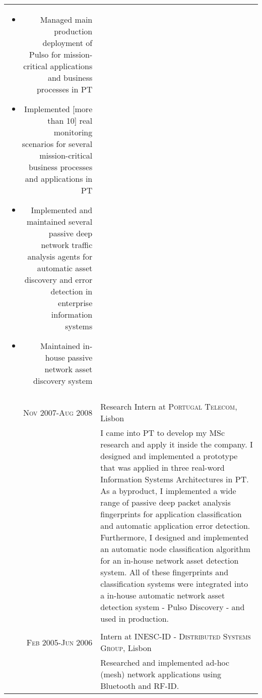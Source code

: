 \documentclass[a4paper,10pt]{article}
\begin{document}
\begin{tabular}{r|p{11cm}}
{{\begin{itemize}
                          \item Managed main production deployment of Pulso for mission-critical applications and business processes in PT
                          \item Implemented [more than 10] real monitoring scenarios for several mission-critical business processes and applications in PT
                          \item Implemented and maintained several passive deep network traffic analysis agents for automatic asset discovery and error detection in enterprise information systems
                          \item Maintained in-house passive network asset discovery system
                        \end{itemize}}}                                                               \\
    \multicolumn{2}{c}{}                                                                              \\

    \textsc{Nov 2007-Aug 2008} & Research Intern at \textsc{Portugal Telecom}, Lisbon                 \\
                      & \footnotesize{I came into PT to develop my MSc research and apply it inside
                                      the company. I designed and implemented a prototype that was
                                      applied in three real-word Information Systems Architectures in
                                      PT. As a byproduct, I implemented a wide range of passive deep
                                      packet analysis fingerprints for application classification and
                                      automatic application error detection. Furthermore, I designed
                                      and implemented an automatic node classification algorithm for
                                      an in-house network asset detection system. All of these
                                      fingerprints and classification systems were integrated into a
                                      in-house automatic network asset detection system - Pulso
                                      Discovery - and used in production.}                            \\
    \multicolumn{2}{c}{}                                                                              \\
    \textsc{Feb 2005-Jun 2006} & Intern at \textsc{INESC-ID - Distributed Systems Group}, Lisbon\\&\footnotesize{Researched and implemented ad-hoc (mesh) network applications using Bluetooth and RF-ID.}
  \end{tabular}
  
\end{document}
